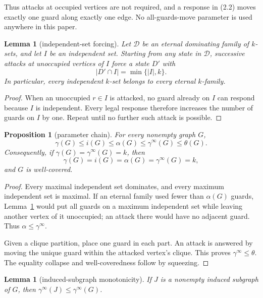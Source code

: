 \documentclass[11pt]{article}
\newtheorem{lemma}[theorem]{Lemma}
\newtheorem{proposition}[theorem]{Proposition}
\theoremstyle{definition}
\theoremstyle{remark}
\newcommand{\gaminf}{\gamma^{\infty}}
\begin{document}
Thus attacks at occupied vertices are not required, and a response in
(2.2) moves exactly one guard along exactly one edge.  No all-guards-move
parameter is used anywhere in this paper.

\begin{lemma}[independent-set forcing]\label{lem:forcing}
Let \(\mathcal D\) be an eternal dominating family of \(k\)-sets, and let
\(I\) be an independent set.  Starting from any state in \(\mathcal D\),
successive attacks at unoccupied vertices of \(I\) force a state \(D'\) with
\[
  |D'\cap I|=\min\{|I|,k\}.
\]
In particular, every independent \(k\)-set belongs to every eternal
\(k\)-family.
\end{lemma}

\begin{proof}
When an unoccupied \(r\in I\) is attacked, no guard already on \(I\) can
respond because \(I\) is independent.  Every legal response therefore
increases the number of guards on \(I\) by one.  Repeat until no further
such attack is possible.
\end{proof}

\begin{proposition}[parameter chain]\label{prop:chain}
For every nonempty graph \(G\),
\[
  \gamma(G)\leq i(G)\leq\alpha(G)\leq\gaminf(G)\leq\theta(G).
\tag{2.3}
\]
Consequently, if \(\gamma(G)=\gaminf(G)=k\), then
\[
  \gamma(G)=i(G)=\alpha(G)=\gaminf(G)=k,
\tag{2.4}
\]
and \(G\) is well-covered.
\end{proposition}

\begin{proof}
Every maximal independent set dominates, and every maximum independent set
is maximal.  If an eternal family used fewer than \(\alpha(G)\) guards,
Lemma~\ref{lem:forcing} would put all guards on a maximum independent set
while leaving another vertex of it unoccupied; an attack there would have
no adjacent guard.  Thus \(\alpha\leq\gaminf\).

Given a clique partition, place one guard in each part.  An attack is
answered by moving the unique guard within the attacked vertex's clique.
This proves \(\gaminf\leq\theta\).  The equality collapse and
well-coveredness follow by squeezing.
\end{proof}

\begin{lemma}[induced-subgraph monotonicity]\label{lem:induced}
If \(J\) is a nonempty induced subgraph of \(G\), then
\(\gaminf(J)\leq\gaminf(G)\).
\end{lemma}
\end{document}
